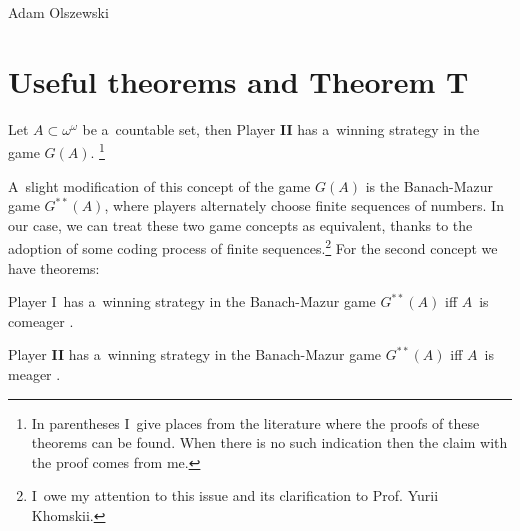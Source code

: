 \begin{artengenv}{Adam Olszewski}
\section{Useful theorems and Theorem T}
\begin{theorem}\label{olsz71}
Let $A\subset\omega^{\omega}$ be a~countable set, then Player \textbf{II} has a~winning strategy in the game $G(A)$.
\emph{\parencite[][p.14]{khomskii_infinite_2010}}%
\footnote{In parentheses I~give places from the literature where the proofs of these theorems can be found. When there is no such indication then the claim with the proof comes from me.}
\end{theorem}

A~slight modification of this concept of the game $G(A)$ is the Banach-Mazur game $G^{**}(A)$, where players alternately choose finite sequences of numbers. In our case, we can treat these two game concepts as equivalent, thanks to the adoption of some coding process of finite sequences.\footnote{I~owe my attention to this issue and its clarification to Prof. Yurii Khomskii.} For the second concept we have theorems:

\begin{theorem}
Player I~has a~winning strategy in the Banach-Mazur game $G^{**}(A)$ iff $A$~is comeager
\emph{\parencite[][p.213]{soare_turing_2016}}.%
\end{theorem}

\begin{proposition}
Player \textbf{II} has a~winning strategy in the Banach-Mazur game $G^{**}(A)$ iff $A$~is meager
\emph{\parencite[][p.213]{soare_turing_2016}}.%
\end{proposition}



\end{artengenv}
